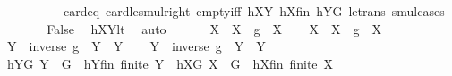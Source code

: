 \begin{isabellebody}
\ \ \ \ \ \ \ \ \ \ card{\isacharunderscore}{\kern0pt}{}{\isacharunderscore}{\kern0pt}eq\ card{\isacharunderscore}{\kern0pt}le{\isacharunderscore}{\kern0pt}smul{\isacharunderscore}{\kern0pt}right\ empty{\isacharunderscore}{\kern0pt}iff\ hXY\ hXfin\ hYG\ le{\isacharunderscore}{\kern0pt}trans\ smul{\isachardot}{\kern0pt}cases{\isacharparenright}{\kern0pt}\isanewline
\ \ \ \ \isamarkupfalse%
\ \isamarkupfalse%
\ False\ \isamarkupfalse%
\ hXYlt\ \isamarkupfalse%
\ auto\isanewline
\ \ \isamarkupfalse%
\isanewline
\ \ \isamarkupfalse%
\ {\isacharquery}{\kern0pt}X{}\ {\isacharequal}{\kern0pt}\ {\isachardoublequoteopen}{\isacharparenleft}{\kern0pt}X\ {\isasymcdots}\ {\isacharbraceleft}{\kern0pt}g{\isacharbraceright}{\kern0pt}{\isacharparenright}{\kern0pt}\ {\isasyminter}\ X{\isachardoublequoteclose}\isanewline
\ \ \isamarkupfalse%
\ {\isacharquery}{\kern0pt}X{}\ {\isacharequal}{\kern0pt}\ {\isachardoublequoteopen}{\isacharparenleft}{\kern0pt}X\ {\isasymcdots}\ {\isacharbraceleft}{\kern0pt}g{\isacharbraceright}{\kern0pt}{\isacharparenright}{\kern0pt}\ {\isasymunion}\ X{\isachardoublequoteclose}\isanewline
\ \ \isamarkupfalse%
\ {\isacharquery}{\kern0pt}Y{}\ {\isacharequal}{\kern0pt}\ {\isachardoublequoteopen}{\isacharparenleft}{\kern0pt}{\isacharbraceleft}{\kern0pt}inverse\ g{\isacharbraceright}{\kern0pt}\ {\isasymcdots}\ Y{\isacharparenright}{\kern0pt}\ {\isasymunion}\ Y{\isachardoublequoteclose}\isanewline
\ \ \isamarkupfalse%
\ {\isacharquery}{\kern0pt}Y{}\ {\isacharequal}{\kern0pt}\ {\isachardoublequoteopen}{\isacharparenleft}{\kern0pt}{\isacharbraceleft}{\kern0pt}inverse\ g{\isacharbraceright}{\kern0pt}\ {\isasymcdots}\ Y{\isacharparenright}{\kern0pt}\ {\isasyminter}\ Y{\isachardoublequoteclose}\isanewline
\ \ \isamarkupfalse%
\ hY{}G{\isacharcolon}{\kern0pt}\ {\isachardoublequoteopen}{\isacharquery}{\kern0pt}Y{}\ {\isasymsubseteq}\ G{\isachardoublequoteclose}\ \ hY{}fin{\isacharcolon}{\kern0pt}\ {\isachardoublequoteopen}finite\ {\isacharquery}{\kern0pt}Y{}{\isachardoublequoteclose}\ \ hX{}G{\isacharcolon}{\kern0pt}\ {\isachardoublequoteopen}{\isacharquery}{\kern0pt}X{}\ {\isasymsubseteq}\ G{\isachardoublequoteclose}\ \ hX{}fin{\isacharcolon}{\kern0pt}\ {\isachardoublequoteopen}finite\ {\isacharquery}{\kern0pt}X{}{\isachardoublequoteclose}\ \isanewline

\end{isabellebody}
